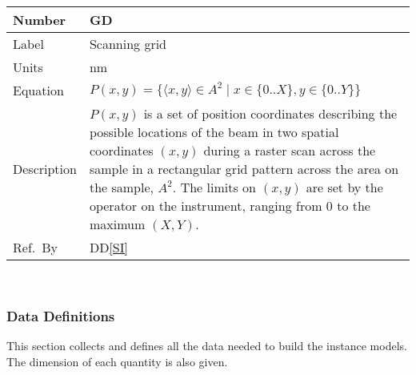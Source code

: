 \documentclass[12pt]{article}
\newcommand{\colAwidth}{0.13\textwidth}
\newcommand{\colBwidth}{0.82\textwidth}
\newcounter{defnum} %
\newcommand{\ddref}[1]{DD\ref{#1}}
\begin{document}
~\newline

\noindent
\begin{minipage}{\textwidth}
	\renewcommand*{\arraystretch}{1.5}
	\begin{tabular}{| p{\colAwidth} | p{\colBwidth}|}
		\hline
		\rowcolor[gray]{0.9}
		Number& GD{defnum}\thedefnum \label{grid}\\
		\hline
		Label & Scanning grid  \\
		\hline
		Units& \si{\nano\metre}\\
		\hline
		Equation& $P(x,y) = \{\langle x, y \rangle \in A^2 \mid x \in \{0..X\}, y \in \{0..Y\} \}$\\
		\hline
		Description & $P(x,y)$ is a set of position coordinates describing the possible locations of the beam in two spatial coordinates $(x, y)$ during a raster scan across the sample in a rectangular grid pattern across the area on the sample, $A^2$. The limits on $(x,y)$ are set by the operator on the instrument, ranging from 0 to the maximum $(X,Y)$.
		\\
		  \hline
		  Ref.\ By & \ddref{SI}\\
		  \hline
	\end{tabular}
\end{minipage}\\

\subsubsection{Data Definitions}\label{sec_datadef}

This section collects and defines all the data needed to build the instance
models. The dimension of each quantity is also given.  

~\newline
\end{document}
